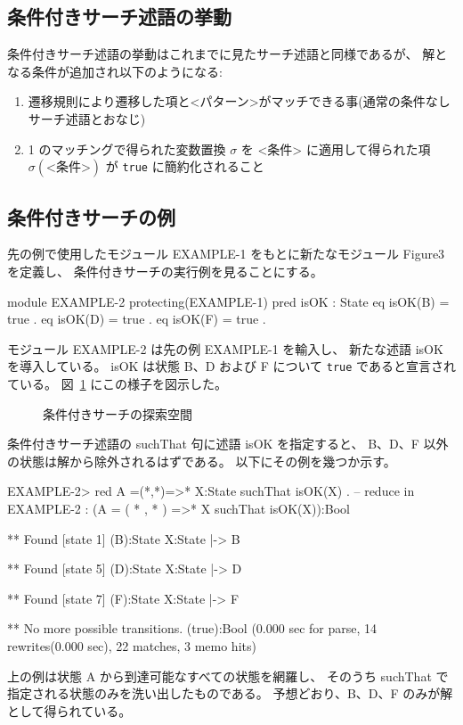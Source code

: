 \documentclass{article}
\begin{document}
\subsection{条件付きサーチ述語の挙動}
条件付きサーチ述語の挙動はこれまでに見たサーチ述語と同様であるが、
解となる条件が追加され以下のようになる:
\begin{enumerate}
\item 遷移規則により遷移した項と<パターン>がマッチできる事(通常の条件なしサーチ述語とおなじ)
\item 1 のマッチングで得られた変数置換 $\sigma$ を <条件> に適用して得られた項 $\sigma(\mbox{<条件>})$ が \texttt{true} に簡約化されること
\end{enumerate}

\subsection{条件付きサーチの例}
先の例で使用したモジュール EXAMPLE-1 をもとに新たなモジュール Figure3 を定義し、
条件付きサーチの実行例を見ることにする。
\begin{simplev}
module EXAMPLE-2 {
  protecting(EXAMPLE-1)
  pred isOK : State 
  eq isOK(B) = true .
  eq isOK(D) = true .
  eq isOK(F) = true .
}
\end{simplev}
モジュール EXAMPLE-2 は先の例 EXAMPLE-1 を輸入し、
新たな述語 isOK を導入している。
isOK は状態 B、D および F について \texttt{true} であると宣言されている。
図~\ref{fig:figure3} にこの様子を図示した。
\begin{figure}[htbp]
  \begin{center}
    
    \caption{条件付きサーチの探索空間}
    \label{fig:figure3}
  \end{center}
\end{figure}

条件付きサーチ述語の suchThat 句に述語 isOK を指定すると、
B、D、F 以外の状態は解から除外されるはずである。
以下にその例を幾つか示す。
\begin{simplev}
EXAMPLE-2> red A =(*,*)=>* X:State suchThat isOK(X) .
-- reduce in EXAMPLE-2 : (A = ( * , * ) =>* X suchThat isOK(X)):Bool

** Found [state 1] (B):State
   { X:State |-> B }

** Found [state 5] (D):State
   { X:State |-> D }

** Found [state 7] (F):State
   { X:State |-> F }

** No more possible transitions.
(true):Bool
(0.000 sec for parse, 14 rewrites(0.000 sec), 22 matches, 3 memo hits)
\end{simplev}
上の例は状態 A から到達可能なすべての状態を網羅し、
そのうち suchThat で指定される状態のみを洗い出したものである。
予想どおり、B、D、F のみが解として得られている。
\end{document}
